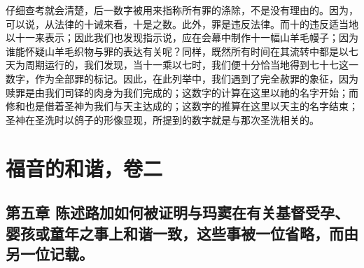 仔细查考就会清楚，后一数字被用来指称所有罪的涤除，不是没有理由的。因为，可以说，从法律的十诫来看，十是之数。此外，罪是违反法律。而十的违反适当地以十一来表示；因此我们也发现指示说，应在会幕中制作十一幅山羊毛幔子；因为谁能怀疑山羊毛织物与罪的表达有关呢？同样，既然所有时间在其流转中都是以七天为周期运行的，我们发现，当十一乘以七时，我们便十分恰当地得到七十七这一数字，作为全部罪的标记。因此，在此列举中，我们遇到了完全赦罪的象征，因为赎罪是由我们司铎的肉身为我们完成的；这数字的计算在这里以祂的名字开始；而修和也是借着圣神为我们与天主达成的；这数字的推算在这里以天主的名字结束；圣神在圣洗时以鸽子的形像显现，所提到的数字就是与那次圣洗相关的。\par



\section{福音的和谐，卷二}


\subsection{第五章 陈述路加如何被证明与玛窦在有关基督受孕、婴孩或童年之事上和谐一致，这些事被一位省略，而由另一位记载。}


